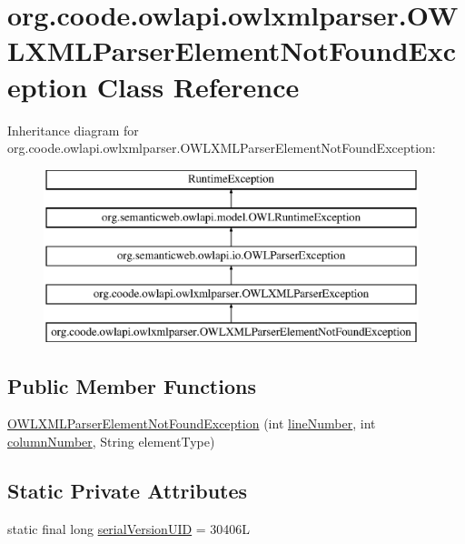 \hypertarget{classorg_1_1coode_1_1owlapi_1_1owlxmlparser_1_1_o_w_l_x_m_l_parser_element_not_found_exception}{\section{org.\-coode.\-owlapi.\-owlxmlparser.\-O\-W\-L\-X\-M\-L\-Parser\-Element\-Not\-Found\-Exception Class Reference}
\label{classorg_1_1coode_1_1owlapi_1_1owlxmlparser_1_1_o_w_l_x_m_l_parser_element_not_found_exception}
}
Inheritance diagram for org.\-coode.\-owlapi.\-owlxmlparser.\-O\-W\-L\-X\-M\-L\-Parser\-Element\-Not\-Found\-Exception\-:\begin{figure}[H]
\begin{center}
\leavevmode
\includegraphics[height=5.000000cm]{classorg_1_1coode_1_1owlapi_1_1owlxmlparser_1_1_o_w_l_x_m_l_parser_element_not_found_exception}
\end{center}
\end{figure}
\subsection*{Public Member Functions}
\begin{DoxyCompactItemize}
\item 
\hyperlink{classorg_1_1coode_1_1owlapi_1_1owlxmlparser_1_1_o_w_l_x_m_l_parser_element_not_found_exception_adf35f8592ea3d4e591983adc44858fb7}{O\-W\-L\-X\-M\-L\-Parser\-Element\-Not\-Found\-Exception} (int \hyperlink{classorg_1_1semanticweb_1_1owlapi_1_1io_1_1_o_w_l_parser_exception_a5a5d515eefd8c2871627e152d86c03c2}{line\-Number}, int \hyperlink{classorg_1_1semanticweb_1_1owlapi_1_1io_1_1_o_w_l_parser_exception_af0ad50fb6962ba9b17a4e358e1b82d38}{column\-Number}, String element\-Type)
\end{DoxyCompactItemize}
\subsection*{Static Private Attributes}
\begin{DoxyCompactItemize}
\item 
static final long \hyperlink{classorg_1_1coode_1_1owlapi_1_1owlxmlparser_1_1_o_w_l_x_m_l_parser_element_not_found_exception_a97891b1efb7671df81fa9862375949f7}{serial\-Version\-U\-I\-D} = 30406\-L
\end{DoxyCompactItemize}


